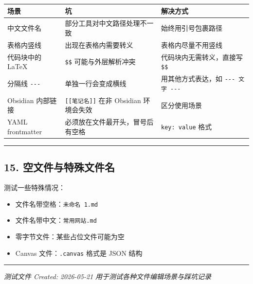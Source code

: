 \documentclass[]{article}
\providecommand{\tightlist}{\itemsep0pt}
\begin{document}
\begin{longtable}[]{@{}
  >{\raggedright\arraybackslash}p{}
  >{\raggedright\arraybackslash}p{}
  >{\raggedright\arraybackslash}p{}@{}}
\toprule\noalign{}
\begin{minipage}[b]{\linewidth}\raggedright
场景
\end{minipage} & \begin{minipage}[b]{\linewidth}\raggedright
坑
\end{minipage} & \begin{minipage}[b]{\linewidth}\raggedright
解决方式
\end{minipage} \\
\midrule\noalign{}
\endhead
\bottomrule\noalign{}
\endlastfoot
中文文件名 & 部分工具对中文路径处理不一致 & 始终用引号包裹路径 \\
表格内竖线 & \texttt{\textbar{}} 出现在表格内需要转义 &
表格内尽量不用竖线 \\
代码块中的 LaTeX & \texttt{\$\$} 可能与外层解析冲突 &
代码块内无需转义，直接写 \texttt{\$\$} \\
分隔线 \texttt{-\/-\/-} & 单独一行会变成横线 & 用其他方式表达，如
\texttt{-\/-\/-\ 文字\ -\/-\/-} \\
Obsidian 内部链接 & \texttt{{[}{[}笔记名{]}{]}} 在非 Obsidian 环境会失效
& 区分使用场景 \\
YAML frontmatter & 必须放在文件最开头，冒号后有空格 &
\texttt{key:\ value} 格式 \\
\end{longtable}

\begin{center}\rule{0.5\linewidth}{0.5pt}\end{center}

\subsection{15.
空文件与特殊文件名}\label{ux7a7aux6587ux4ef6ux4e0eux7279ux6b8aux6587ux4ef6ux540d}

测试一些特殊情况：

\begin{itemize}
\tightlist
\item
  文件名带空格：\texttt{未命名\ 1.md}
\item
  文件名带中文：\texttt{常用网站.md}
\item
  零字节文件：某些占位文件可能为空
\item
  Canvas 文件：\texttt{.canvas} 格式是 JSON 结构
\end{itemize}

\begin{center}\rule{0.5\linewidth}{0.5pt}\end{center}

\emph{测试文件 Created: 2026-05-21}
\emph{用于测试各种文件编辑场景与踩坑记录}
\end{document}

